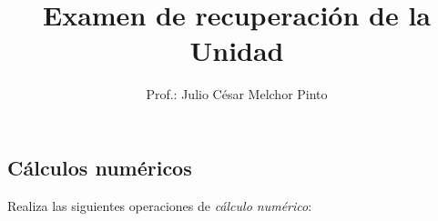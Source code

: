 \documentclass[12pt,addpoints,answers]{evalua}
\title{Examen de {\color{brown}recuperación} de la Unidad}
\author{Prof.: Julio César Melchor Pinto}
\begin{document}
%
\begin{multicols}{2}
	\tableofcontents
\end{multicols}\newpage
\begin{questions}\large
	\section{Cálculos numéricos}

      \question[10] Realiza las siguientes operaciones de \textit{cálculo numérico}:
   
      \begin{parts}
\end{parts}
\end{questions}
\end{document}
